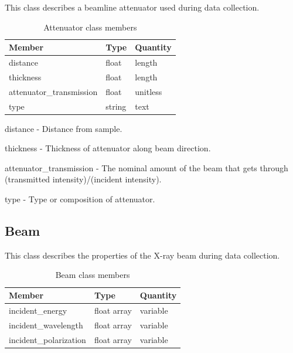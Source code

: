 \documentclass[usletter,11pt]{article}
\newcommand{\member}[2]
{ \noindent
{ \color{softBlue}  #1 - } #2
\vspace{0.2cm}
}
\begin{document}
This class describes a beamline attenuator used during data collection.

\begin{table}[h!]\sffamily \footnotesize
\caption{Attenuator class members}

\begin{tabular}{p{4.5cm} p{4.5cm}  p{2.5cm}}
\toprule
\bfseries Member     & \bfseries Type & \bfseries Quantity \\
\midrule
distance & float & length \\
thickness & float & length \\
attenuator\_transmission & float & unitless \\ 
type & string & text \\
\bottomrule
\end{tabular}
\end{table}

\member{distance}{Distance from sample.}

\member{thickness}{Thickness of attenuator along beam direction.}

\member{attenuator\_transmission}{The nominal amount of the beam that
gets through (transmitted intensity)/(incident intensity).}

\member{type}{Type or composition of attenuator.}

\subsection{Beam}
\label{table:beam}

This class describes the properties of the X-ray beam during data collection.

\begin{table}[h!]\sffamily \footnotesize
	\caption{Beam class members}
	
	\begin{tabular}{p{4.5cm} p{4.5cm}  p{2.5cm} }
		\toprule
		\bfseries Member     & \bfseries Type & \bfseries Quantity \\
		\midrule
	   incident\_energy  & float array & variable  \\
       incident\_wavelength & float array & variable \\
       incident\_polarization & float array & variable \\
		\bottomrule
	\end{tabular}
\end{table}
\end{document}
